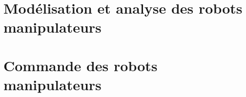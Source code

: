 \documentclass[letterpaper,oneside,french]{book}
\begin{document}

\setcounter{tocdepth}{0}\noptcrule
{\hypersetup{linkcolor=black}
\doparttoc[n]
\tableofcontents
\newpage
}


% 

\part{Modélisation et analyse des robots manipulateurs}
\label{sec:manip}
{\hypersetup{linkcolor=black}
\parttoc
}









\part{Commande des robots manipulateurs}
\label{sec:manip_control}
{\hypersetup{linkcolor=black}
\parttoc
}




% 

\end{document}
